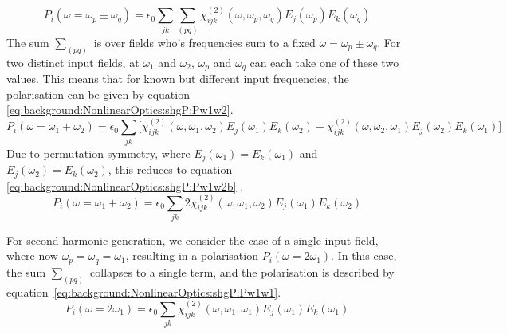 \begin{equation}\label{eq:background:NonlinearOptics:shgP:Psfg}
	P_{i}(\omega=\omega_{p}\pm\omega_{q} ) =  \epsilon_{0} \sum_{jk} \sum_{(pq)}
				\chi^{(2)}_{ijk}(\omega, \omega_{p},\omega_{q} ) 
				E_{j}(\omega_{p} ) E_{k}(\omega_{q} )
\end{equation}
The sum $\sum_{(pq)}$ is over fields who's frequencies sum to a fixed $\omega=\omega_{p}\pm\omega_{q}$. For two distinct input fields, at $\omega_{1}$ and $\omega_{2}$, $\omega_{p}$ and $\omega_{q}$ can each take one of these two values. This means that for known but different input frequencies, the polarisation can be given by equation \ref{eq:background:NonlinearOptics:shgP:Pw1w2}.
\begin{equation}\label{eq:background:NonlinearOptics:shgP:Pw1w2}
	P_{i}(\omega=\omega_{1}+\omega_{2} ) =  \epsilon_{0} \sum_{jk} \big[
				\chi^{(2)}_{ijk}(\omega, \omega_{1},\omega_{2} ) 
				E_{j}(\omega_{1} ) E_{k}(\omega_{2} ) +
				\chi^{(2)}_{ijk}(\omega, \omega_{2},\omega_{1} ) 
				E_{j}(\omega_{2} ) E_{k}(\omega_{1} )
				\big]
\end{equation}
Due to permutation symmetry, where $E_{j}(\omega_{1} )=E_{k}(\omega_{1} )$ and $E_{j}(\omega_{2} )=E_{k}(\omega_{2} )$, this reduces to equation \ref{eq:background:NonlinearOptics:shgP:Pw1w2b} \cite[eq. 1.3.15]{Boyd2008a}.
\begin{equation}\label{eq:background:NonlinearOptics:shgP:Pw1w2b}
	P_{i}(\omega=\omega_{1}+\omega_{2} ) =  \epsilon_{0} \sum_{jk}
				2 \chi^{(2)}_{ijk}(\omega, \omega_{1},\omega_{2} ) 
				E_{j}(\omega_{1} ) E_{k}(\omega_{2} )
\end{equation}

For second harmonic generation, we consider the case of a single input field, where now $\omega_{p}=\omega_{q}=\omega_{1}$, resulting in a polarisation $P_{i}(\omega=2\omega_{1} )$. In this case, the sum $\sum_{(pq)}$ collapses to a single term, and the polarisation is described by equation~\ref{eq:background:NonlinearOptics:shgP:Pw1w1}.
\begin{equation}\label{eq:background:NonlinearOptics:shgP:Pw1w1}
	P_{i}(\omega=2\omega_{1} ) =  \epsilon_{0} \sum_{jk}
				\chi^{(2)}_{ijk}(\omega, \omega_{1},\omega_{1} ) 
				E_{j}(\omega_{1} ) E_{k}(\omega_{1} )
\end{equation}



